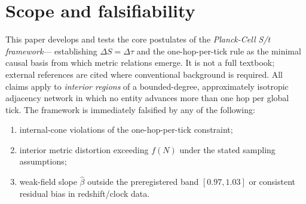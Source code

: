 \section*{Scope and falsifiability}
This paper develops and tests the core postulates of the \emph{Planck-Cell S/t framework}—%
establishing $\Delta S = \Delta\tau$ and the one-hop-per-tick rule as the minimal causal basis
from which metric relations emerge.  It is not a full textbook; external references are cited
where conventional background is required.  All claims apply to \emph{interior regions} of a
bounded-degree, approximately isotropic adjacency network in which no entity advances more
than one hop per global tick.  The framework is immediately falsified by any of the following:
\begin{enumerate}[label=(\roman*)]
  \item internal-cone violations of the one-hop-per-tick constraint;
  \item interior metric distortion exceeding $f(N)$ under the stated sampling assumptions;
  \item weak-field slope $\hat{\beta}$ outside the preregistered band $[0.97,1.03]$ or consistent residual bias in redshift/clock data.
\end{enumerate}
